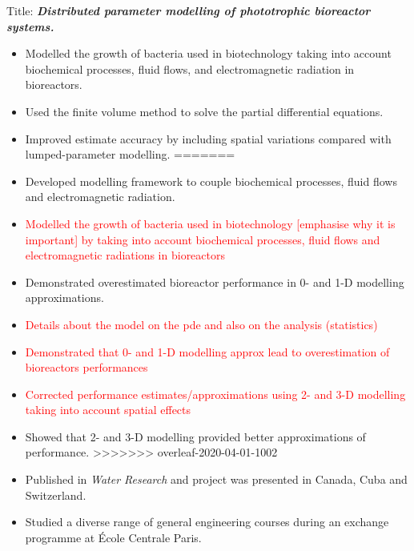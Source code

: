 \vspace{0.2mm}
Title: \textbf{\textit{Distributed parameter modelling of phototrophic bioreactor systems.}}
\begin{itemize}
<<<<<<< HEAD
    \item Modelled the growth of bacteria used in biotechnology taking
    into account biochemical processes, fluid flows, and electromagnetic
    radiation in bioreactors.
    \item Used the finite volume method to solve the partial differential equations.
    \item Improved estimate accuracy by including spatial variations compared with
    lumped-parameter modelling.
=======
    \item Developed modelling framework to couple biochemical processes, fluid flows and electromagnetic radiation.
    \item \textcolor{red}{Modelled the growth of bacteria used in biotechnology [emphasise why it is important] by taking into account biochemical processes, fluid flows and electromagnetic radiations in bioreactors }
    \item Demonstrated overestimated bioreactor performance in 0- and 1-D modelling approximations. 
    \item \textcolor{red}{Details about the model on the pde and also on the analysis (statistics)}
    \item \textcolor{red}{Demonstrated that 0- and 1-D modelling approx lead to overestimation of bioreactors performances}
    \item \textcolor{red}{Corrected performance estimates/approximations using 2- and 3-D modelling taking into account spatial effects}
    \item Showed that 2- and 3-D modelling provided better approximations of performance.
>>>>>>> overleaf-2020-04-01-1002
    \item Published in \textit{Water Research} and project was presented in Canada, Cuba and Switzerland. 
\end{itemize}
\divider\smallskip


\begin{itemize}
\item Studied a diverse range of general engineering courses during an exchange programme at \'Ecole Centrale Paris.
\end{itemize}


